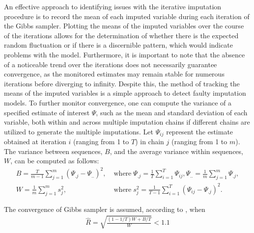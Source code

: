 An effective approach to identifying issues with the iterative imputation procedure is to record the mean of each imputed variable during each iteration of the Gibbs sampler. Plotting the means of the imputed variables over the course of the iterations allows for the determination of whether there is the expected random fluctuation or if there is a discernible pattern, which would indicate problems with the model. Furthermore, it is important to note that the absence of a noticeable trend over the iterations does not necessarily guarantee convergence, as the monitored estimates may remain stable for numerous iterations before diverging to infinity. Despite this, the method of tracking the means of the imputed variables is a simple approach to detect faulty imputation models. To further monitor convergence, one can compute the variance of a specified estimate of interest $\Psi$, such as the mean and standard deviation of each variable, both within and across multiple imputation chains if different chains are utilized to generate the multiple imputations. Let $\Psi_{ij}$ represent the estimate obtained at iteration $i$ (ranging from 1 to $T$) in chain $j$ (ranging from 1 to $m$). The variance between sequences, $B$, and the average variance within sequences, $W$, can be computed as follows:
\begin{align*}
  B = \frac{T}{m-1}\sum_{j=1}^{m}(\Psi_{.j}-\Psi_{..})^{2},\;&\text{where}\; \Psi_{.j}=\frac{1}{T}\sum_{i=1}^{T}\Psi_{ij}, \Psi_{..}=\frac{1}{m}\sum _{j=1}^{m}\Psi_{.j},\\
  W = \frac{1}{m}\sum_{j=1}^{m}s_{j}^{2},\;&\text{where}\; s_{j}^{2} = \frac{1}{T-1}\sum_{i=1}^{T}(\Psi_{ij}-\Psi_{.j})^2.
\end{align*}

The convergence of Gibbs sampler is assumed, according to \citet{gelman2004parameterization}, when 
\begin{align}
\label{eqn:converge}
    \hat{R}=\sqrt{\frac{(1-1/T)W+B/T}{W}}<1.1
\end{align}

